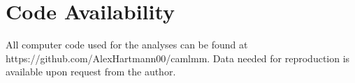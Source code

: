 \section{Code Availability}

All computer code used for the analyses can be found at https://github.com/AlexHartmann00/camlmm. Data needed for reproduction is available upon request from the author.